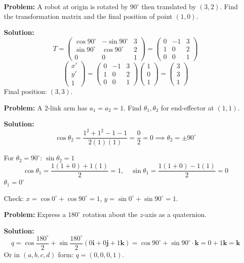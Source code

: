 \begin{exbox}
\textbf{Problem:} A robot at origin is rotated by $90^\circ$ then translated by $(3, 2)$. Find the transformation matrix and the final position of point $(1, 0)$.

\textbf{Solution:}
\[
T = \begin{pmatrix} \cos 90^\circ & -\sin 90^\circ & 3 \\ \sin 90^\circ & \cos 90^\circ & 2 \\ 0 & 0 & 1 \end{pmatrix} = \begin{pmatrix} 0 & -1 & 3 \\ 1 & 0 & 2 \\ 0 & 0 & 1 \end{pmatrix}
\]
\[
\begin{pmatrix} x' \\ y' \\ 1 \end{pmatrix} = \begin{pmatrix} 0 & -1 & 3 \\ 1 & 0 & 2 \\ 0 & 0 & 1 \end{pmatrix} \begin{pmatrix} 1 \\ 0 \\ 1 \end{pmatrix} = \begin{pmatrix} 3 \\ 3 \\ 1 \end{pmatrix}
\]
Final position: $(3, 3)$.
\end{exbox}

\begin{exbox}
\textbf{Problem:} A 2-link arm has $a_1 = a_2 = 1$. Find $\theta_1, \theta_2$ for end-effector at $(1, 1)$.

\textbf{Solution:}
\[
\cos\theta_2 = \frac{1^2 + 1^2 - 1 - 1}{2(1)(1)} = \frac{0}{2} = 0 \implies \theta_2 = \pm 90^\circ
\]

For $\theta_2 = 90^\circ$: $\sin\theta_2 = 1$
\[
\cos\theta_1 = \frac{1(1+0) + 1(1)}{2} = 1, \quad \sin\theta_1 = \frac{1(1+0) - 1(1)}{2} = 0
\]
$\theta_1 = 0^\circ$

Check: $x = \cos 0^\circ + \cos 90^\circ = 1$, $y = \sin 0^\circ + \sin 90^\circ = 1$. \checkmark
\end{exbox}

\begin{exbox}
\textbf{Problem:} Express a $180^\circ$ rotation about the $z$-axis as a quaternion.

\textbf{Solution:}
\[
q = \cos\frac{180^\circ}{2} + \sin\frac{180^\circ}{2}(0\mathbf{i} + 0\mathbf{j} + 1\mathbf{k}) = \cos 90^\circ + \sin 90^\circ \cdot \mathbf{k} = 0 + 1\mathbf{k} = \mathbf{k}
\]
Or in $(a, b, c, d)$ form: $q = (0, 0, 0, 1)$.
\end{exbox}
